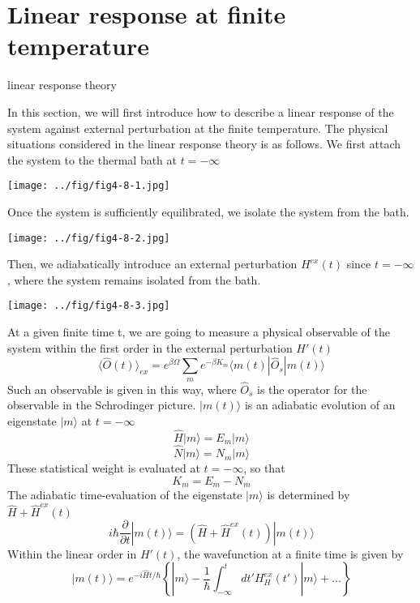 \section{Linear response at finite temperature}
\begin{center}
linear response theory
\end{center}
 In this section, we will first introduce how to describe a linear response of the system against external perturbation at the finite temperature.
 The physical situations considered in the linear response theory is as follows.
 We first attach the system to the thermal bath at $t=-\infty$
\begin{center}
\texttt{[image: ../fig/fig4-8-1.jpg]}
\end{center}
 Once the system is sufficiently equilibrated, we isolate the system from the bath.
\begin{center}
\texttt{[image: ../fig/fig4-8-2.jpg]}
\end{center}
 Then, we adiabatically introduce an external perturbation $H^{ex}(t)$ since $t=-\infty$, where the system remains isolated from the bath.
\begin{center}
\texttt{[image: ../fig/fig4-8-3.jpg]}
\end{center}
 At a given finite time t, we are going to measure a physical observable of the system within the first order in the external perturbation $H'(t)$
\begin{equation}\label{eq4.8.1}
\langle \hat O(t)\rangle_{ex}=e^{\beta\Omega} \sum_m e^{-\beta K_m} \langle m(t)|\hat O _s|m(t)\rangle
\end{equation}
 Such an observable is given in this way, where $\hat O_s$ is the operator for the observable in the Schrodinger picture.
 $|m(t)\rangle$ is an adiabatic evolution of an eigenstate $|m\rangle$ at $t=-\infty$
\[
\hat H |m\rangle=E_m|m\rangle
\]
\[
\hat N |m\rangle=N_m|m\rangle
\]
 These statistical weight is evaluated at $t=-\infty$, so that 
\[
K_m=E_m-N_m
\]
 The adiabatic time-evaluation of the eigenstate $| m\rangle$ is determined by $\hat H+\hat H^{ex}(t)$
\begin{equation}
i\hbar \frac{\partial}{\partial t}|m(t)\rangle=(\hat H+\hat H^{ex}(t))|m(t)\rangle
\end{equation}
 Within the linear order in $H'(t)$, the wavefunction at a finite time is given by
\begin{equation}
|m(t)\rangle=e^{-i\hat H t/\hbar}\left\{ |m\rangle -\frac{1}{\hbar} \int _{-\infty}^t dt' H_H^{ex}(t') |m\rangle+... \right\}
\end{equation}
